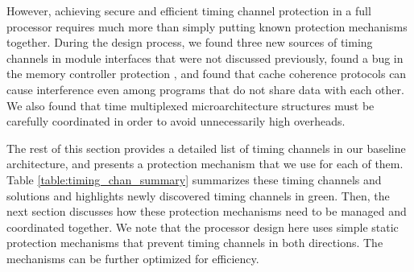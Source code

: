 
However, achieving secure and efficient timing channel protection in a full 
processor requires much more than simply putting known protection mechanisms
together. During the design process, we found three new sources of timing 
channels in module interfaces that were not discussed previously, found a
bug in the memory controller protection \cite{ushpca14}, and found that cache 
coherence protocols can cause interference even among programs that do not 
share data with each other.
We also found that time multiplexed
microarchitecture structures must be carefully coordinated in order to avoid 
unnecessarily high overheads. 

The rest of this section provides a detailed list of timing channels in our
baseline architecture, and presents a protection mechanism that we use for each 
of them.
Table \ref{table:timing_chan_summary} summarizes these timing channels and
solutions and highlights newly discovered timing channels in green.
Then, the next section discusses how these protection mechanisms
need to be managed and coordinated together.
We note that the processor design here uses simple static protection
mechanisms that prevent timing channels in both directions. The mechanisms can 
be further optimized for efficiency.

